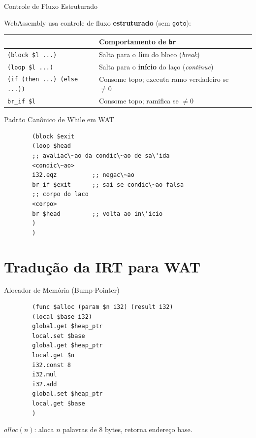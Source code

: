 \begin{frame}[fragile]{Controle de Fluxo Estruturado}

    WebAssembly usa controle de fluxo \textbf{estruturado} (sem
    \texttt{goto}):

    \begin{table}
        \begin{tabular}{l l l l}
            }
            }@{}}
            \hline
            Construtor & Comportamento de \texttt{br} \\
        \hline
        \texttt{(block \$l ...)} & Salta para o \textbf{fim} do
        bloco (\emph{break}) \\
        \texttt{(loop \$l ...)} & Salta para o \textbf{início}
        do laço (\emph{continue}) \\
        \texttt{(if (then ...) (else ...))} & Consome topo;
        executa ramo verdadeiro se \(\neq 0\) \\
        \texttt{br\_if \$l} & Consome topo; ramifica se
        \(\neq 0\) \\
        \hline
    \end{tabular}
\end{table}
\end{frame}

\begin{frame}[fragile]{Padrão Canônico de While em WAT}

    \begin{lstlisting}
        (block $exit
        (loop $head
        ;; avaliac\~ao da condic\~ao de sa\'ida
        <condic\~ao>
        i32.eqz          ;; negac\~ao
        br_if $exit      ;; sai se condic\~ao falsa
        ;; corpo do laco
        <corpo>
        br $head         ;; volta ao in\'icio
        )
        )
    \end{lstlisting}
\end{frame}


\section{Tradução da IRT para
WAT}\label{traduuxe7uxe3o-da-irt-para-wat}

\begin{frame}[fragile]{Alocador de Memória (Bump-Pointer)}

    \begin{lstlisting}
        (func $alloc (param $n i32) (result i32)
        (local $base i32)
        global.get $heap_ptr
        local.set $base
        global.get $heap_ptr
        local.get $n
        i32.const 8
        i32.mul
        i32.add
        global.set $heap_ptr
        local.get $base
        )
    \end{lstlisting}

    \(\mathit{alloc}(n)\): aloca \(n\) palavras de 8 bytes, retorna endereço
    base.
\end{frame}

